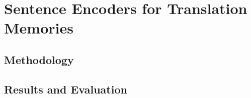 \chapter{\label{cha:sentence_encoders}Sentence Encoders for Translation Memories}

\cite{ranasinghe-etal-2020-intelligent}

\section{Methodology}

\section{Results and Evaluation}